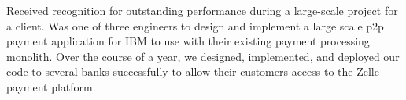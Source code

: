 \documentclass[10pt, a4paper]{cvhari}
\begin{document}
    \smallskip 
    \dividergray
    \smallskip
    
    {Received recognition for outstanding performance during a large-scale project for a client. Was one of three engineers to design and implement a large scale p2p payment application for IBM to use with their existing payment processing monolith. Over the course of a year, we designed, implemented, and deployed our code to several banks successfully to allow their customers access to the Zelle payment platform.}\par
    
    \medskip
\end{document}
